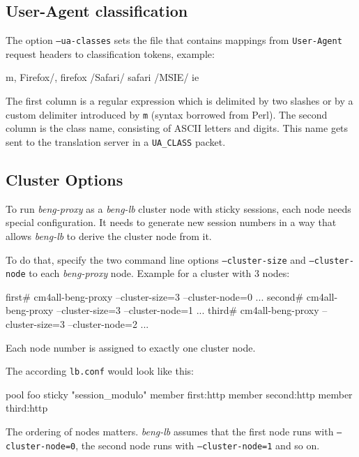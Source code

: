 \documentclass[a4paper,12pt]{article}
\begin{document}
\subsection{User-Agent classification}
\label{uaclass}

The option \texttt{--ua-classes} sets the file that contains mappings
from \texttt{User-Agent} request headers to classification tokens,
example:

\begin{verbatim*}
m, Firefox/, firefox
/Safari/ safari
/MSIE/ ie
\end{verbatim*}

The first column is a regular expression which is delimited by two
slashes or by a custom delimiter introduced by \texttt{m} (syntax
borrowed from Perl).  The second column is the class name, consisting
of ASCII letters and digits.  This name gets sent to the translation
server in a \verb|UA_CLASS| packet.

\subsection{Cluster Options}

To run \emph{beng-proxy} as a \emph{beng-lb} cluster node with sticky
sessions, each node needs special configuration.  It needs to generate
new session numbers in a way that allows \emph{beng-lb} to derive the
cluster node from it.

To do that, specify the two command line options
\texttt{--cluster-size} and \texttt{--cluster-node} to each
\emph{beng-proxy} node.  Example for a cluster with 3 nodes:

\begin{verbatim*}
first# cm4all-beng-proxy --cluster-size=3 --cluster-node=0 ...
second# cm4all-beng-proxy --cluster-size=3 --cluster-node=1 ...
third# cm4all-beng-proxy --cluster-size=3 --cluster-node=2 ...
\end{verbatim*}

Each node number is assigned to exactly one cluster node.

The according \texttt{lb.conf} would look like this:

\begin{verbatim*}
pool foo {
  sticky "session_modulo"
  member first:http
  member second:http
  member third:http
}
\end{verbatim*}

The ordering of nodes matters.  \emph{beng-lb} assumes that the first
node runs with \texttt{--cluster-node=0}, the second node runs with
\texttt{--cluster-node=1} and so on.
\end{document}
